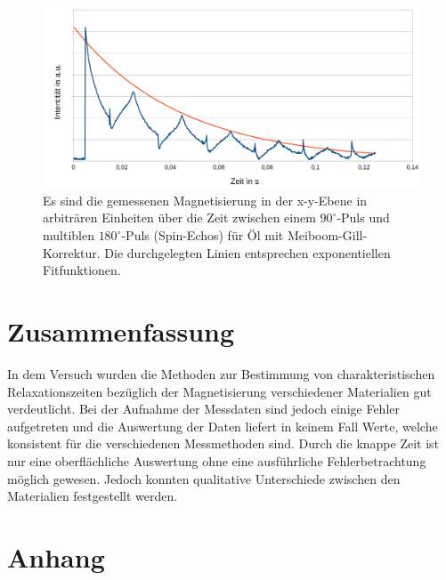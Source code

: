 \documentclass[numbers=noenddot,a4paper,notitlepage,twoside,BCOR15mm]{scrartcl}
\begin{document}
	\begin{figure}[h]
		\centering
		\includegraphics[width=1\textwidth]{pics/T2_Oel_MG}
		\caption{Es sind die gemessenen Magnetisierung in der x-y-Ebene in arbiträren Einheiten über die Zeit zwischen einem $90^\circ$-Puls und multiblen $180^\circ$-Puls (Spin-Echos) für Öl mit Meiboom-Gill-Korrektur. Die durchgelegten Linien entsprechen exponentiellen Fitfunktionen.}
		\label{abb:T2_Oel_MG}
	\end{figure}

	\section{Zusammenfassung}
	
	In dem Versuch wurden die Methoden zur Bestimmung von charakteristischen Relaxationszeiten bezüglich der Magnetisierung verschiedener Materialien gut verdeutlicht. Bei der Aufnahme der Messdaten sind jedoch einige Fehler aufgetreten und die Auswertung der Daten liefert in keinem Fall Werte, welche konsistent für die verschiedenen Messmethoden sind. Durch die knappe Zeit ist nur eine oberflächliche Auswertung ohne eine ausführliche Fehlerbetrachtung möglich gewesen. Jedoch konnten qualitative Unterschiede zwischen den Materialien festgestellt werden.
	
	\newpage
	
	\section{Anhang}
	
		
		
\end{document}
